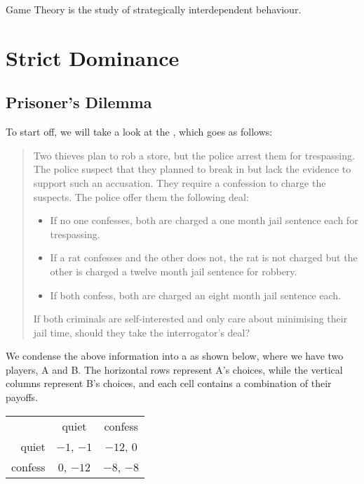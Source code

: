 Game Theory is the study of strategically interdependent behaviour.
\section{Strict Dominance}
\subsection{Prisoner's Dilemma}
To start off, we will take a look at the , which goes as follows:

\begin{quote}
Two thieves plan to rob a store, but the police arrest them for trespassing. The police suspect that they planned to break in but lack the evidence to support such an accusation. They require a confession to charge the suspects. The police offer them the following deal:
\begin{itemize}
\item If no one confesses, both are charged a one month jail sentence each for trespassing.
\item If a rat confesses and the other does not, the rat is not charged but the other is charged a twelve month jail sentence for robbery.
\item If both confess, both are charged an eight month jail sentence each.
\end{itemize}
If both criminals are self-interested and only care about minimising their jail time, should they take the interrogator's deal?
\end{quote}

We condense the above information into a  as shown below, where we have two players, A and B. The horizontal rows represent A's choices, while the vertical columns represent B's choices, and each cell contains a combination of their payoffs.

\begin{table}[H]
\centering
\begin{tabular}{rcc}
\multicolumn{1}{l}{}         & quiet                       & confess                     \\ \cline{2-3} 
\multicolumn{1}{r|}{quiet}   & \multicolumn{1}{c|}{$-1$, $-1$} & \multicolumn{1}{c|}{$-12$, $0$} \\ \cline{2-3} 
\multicolumn{1}{r|}{confess} & \multicolumn{1}{c|}{$0$, $-12$} & \multicolumn{1}{c|}{$-8$, $-8$} \\ \cline{2-3} 
\end{tabular}
\end{table}


